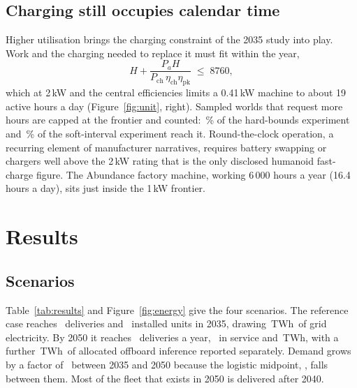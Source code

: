 \documentclass[11pt]{article}
\newcommand{\TWh}{\,TWh}
\newcommand{\figref}[1]{Figure~\ref{#1}}
\newcommand{\tabref}[1]{Table~\ref{#1}}
\begin{document}
\subsection{Charging still occupies calendar time}
Higher utilisation brings the charging constraint of the 2035 study into play. Work and the charging needed to replace it must fit within the year,
\begin{equation}\label{eq:calendar}
H + \frac{P_a H}{P_{\mathrm{ch}}\,\eta_{\mathrm{ch}}\eta_{\mathrm{pk}}} \;\le\; 8760,
\end{equation}
which at 2\,kW and the central efficiencies limits a 0.41\,kW machine to about 19 active hours a day (\figref{fig:unit}, right). Sampled worlds that request more hours are capped at the frontier and counted: \MCHCapped\,\% of the hard-bounds experiment and \MCSCapped\,\% of the soft-interval experiment reach it. Round-the-clock operation, a recurring element of manufacturer narratives, requires battery swapping or chargers well above the 2\,kW rating that is the only disclosed humanoid fast-charge figure. The Abundance factory machine, working 6\,000 hours a year (16.4 hours a day), sits just inside the 1\,kW frontier.

\section{Results}\label{sec:results}

\subsection{Scenarios}
\tabref{tab:results} and \figref{fig:energy} give the four scenarios. The reference case reaches \RefShipThirtyFive\ deliveries and \RefStockThirtyFive\ installed units in 2035, drawing \RefTWhThirtyFive\TWh\ of grid electricity. By 2050 it reaches \RefShipFifty\ deliveries a year, \RefStockFifty\ in service and \RefTWhFifty\TWh, with a further \RefOffFifty\TWh\ of allocated offboard inference reported separately. Demand grows by a factor of \RatioFiftyThirtyFive\ between 2035 and 2050 because the logistic midpoint, \Reftm, falls between them. Most of the fleet that exists in 2050 is delivered after 2040.
\end{document}

